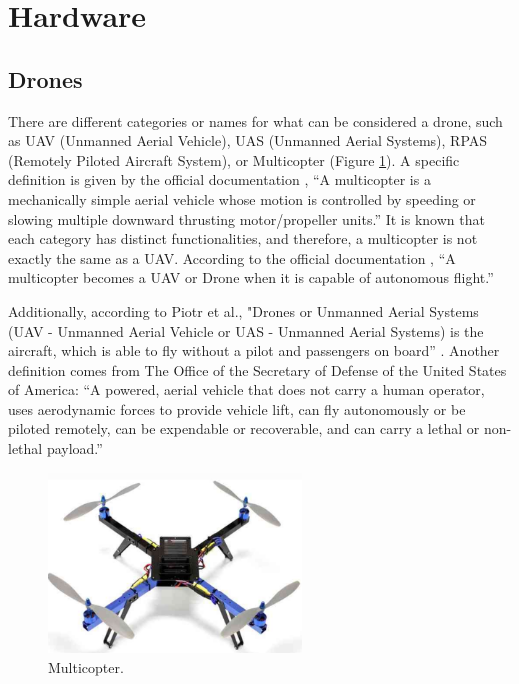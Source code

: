 
\section{Hardware}

\subsection{Drones}

    There are different categories or names for what can be considered a drone, such as UAV (Unmanned Aerial Vehicle), UAS (Unmanned Aerial Systems), RPAS (Remotely Piloted Aircraft System), or Multicopter (Figure \ref{fig:multicopter}). A specific definition is given by the official documentation \cite{ardupilot}, “A multicopter is a mechanically simple aerial vehicle whose motion is controlled by speeding or slowing multiple downward thrusting motor/propeller units.” It is known that each category has distinct functionalities, and therefore, a multicopter is not exactly the same as a UAV. According to the official documentation \cite{ardupilot}, “A multicopter becomes a UAV or Drone when it is capable of autonomous flight.”

    Additionally, according to Piotr et al., "Drones or Unmanned Aerial Systems (UAV - Unmanned Aerial Vehicle or UAS - Unmanned Aerial Systems) is the aircraft, which is able to fly without a pilot and passengers on board” \cite{piotr_drones}. Another definition comes from The Office of the Secretary of Defense of the United States of America: “A powered, aerial vehicle that does not carry a human operator, uses aerodynamic forces to provide vehicle lift, can fly autonomously or be piloted remotely, can be expendable or recoverable, and can carry a lethal or non-lethal payload.”

    \begin{figure}[h!]
        \centering
        \includegraphics[width=0.6\textwidth]{pictures/multicopter.png}
        \caption{Multicopter.}
        \label{fig:multicopter}
    \end{figure}

